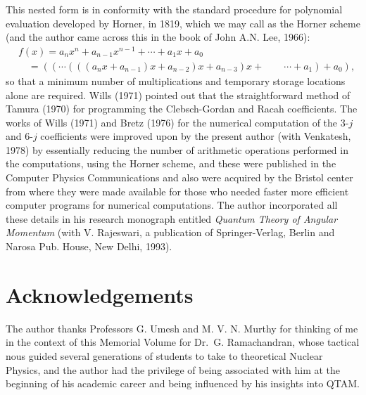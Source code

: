 This nested form is in conformity with the standard procedure for polynomial evaluation developed by Horner, in 1819, which we may call as the Horner scheme (and the author came across this in the book of John A.N. Lee, 1966):
\begin{equation}
\begin{split}
& f(x) = a_nx^n + a_{n-1}x^{n-1} + \cdots + a_1x + a_0 \\
& \quad = ((\cdots (((a_nx+ a_{n-1})x + a_{n-2})x + a_{n-3})x + \qquad \cdots + a_1) + a_0), \label{chap7-eq61}
\end{split}
\end{equation}
so that a minimum number of multiplications and temporary storage locations alone are required. Wills (1971) pointed out that the straightforward method of Tamura (1970) for programming the Clebsch-Gordan and Racah coefficients. The works of Wills (1971) and Bretz (1976) for the numerical computation of the 3-$j$ and 6-$j$ coefficients were improved upon by the present author (with Venkatesh, 1978) by essentially reducing the number of arithmetic operations performed in the computations, using the Horner scheme, and these were published in the Computer Physics Communications and also were acquired by the Bristol center from where they were made available for those who needed faster more efficient computer programs for numerical computations. The author incorporated all these details in his research monograph entitled \textit{Quantum Theory of Angular Momentum} (with V. Rajeswari, a publication of Springer-Verlag, Berlin and Narosa Pub. House, New Delhi, 1993).

\section*{Acknowledgements}

The author thanks Professors G. Umesh and M. V. N. Murthy 
for thinking of me in the context of this Memorial Volume for Dr.\ G. Ramachandran, whose tactical nous guided several generations of students to take to theoretical Nuclear Physics, and the author had the privilege of being associated with him at the beginning of his academic career and being influenced by his insights into QTAM.

